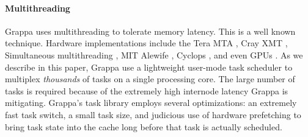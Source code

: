 
\paragraph{Multithreading} Grappa uses multithreading to tolerate memory
latency. This is a well known technique. Hardware implementations
include the Tera MTA \cite{tera:mta1}, Cray XMT \cite{feo:xmt},
Simultaneous multithreading \cite{tullsen:smt}, MIT Alewife
\cite{agarwal:alewife}, Cyclops \cite{almasi:cyclops}, and even GPUs
\cite{gpus}. As we describe in this paper, Grappa use a lightweight
user-mode task scheduler to multiplex \emph{thousands} of tasks on a
single processing core. The large number of tasks is required because of
the extremely high internode latency Grappa is mitigating.  Grappa's
task library employs several optimizations: an extremely fast task
switch, a small task size, and judicious use of hardware prefetching to
bring task state into the cache long before that task is actually
scheduled.
